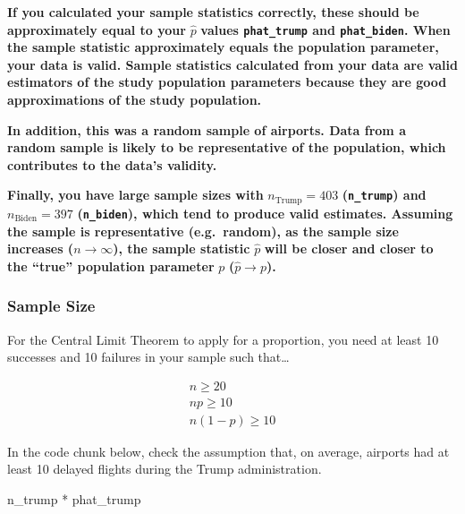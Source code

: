 \documentclass[
  letterpaper,
  DIV=11,
  numbers=noendperiod]{scrartcl}
\newenvironment{Shaded}{\begin{snugshade}}{\end{snugshade}}
\newcommand{\NormalTok}[1]{\textcolor[rgb]{0.00,0.23,0.31}{#1}}
\newcommand{\SpecialCharTok}[1]{\textcolor[rgb]{0.37,0.37,0.37}{#1}}
\begin{document}
\begin{tcolorbox}[enhanced jigsaw, toprule=.15mm, breakable, leftrule=.75mm, bottomrule=.15mm, rightrule=.15mm, colback=white, opacityback=0, colframe=quarto-callout-warning-color-frame, left=2mm, arc=.35mm]

\textbf{If you calculated your sample statistics correctly, these should
be approximately equal to your} \(\hat{p}\) \textbf{values
\texttt{phat\_trump} and \texttt{phat\_biden}. When the sample statistic
approximately equals the population parameter, your data is valid.
Sample statistics calculated from your data are valid estimators of the
study population parameters because they are good approximations of the
study population.}

\textbf{In addition, this was a random sample of airports. Data from a
random sample is likely to be representative of the population, which
contributes to the data's validity.}

\textbf{Finally, you have large sample sizes with}
\(n_{\text{Trump}}=403\) \textbf{(\texttt{n\_trump}) and}
\(n_{\text{Biden}}=397\) \textbf{(\texttt{n\_biden}), which tend to
produce valid estimates. Assuming the sample is representative
(e.g.~random), as the sample size increases (}\(n \to \infty\)\textbf{),
the sample statistic} \(\hat{p}\) \textbf{will be closer and closer to
the ``true'' population parameter} \(p\)
\textbf{(}\(\hat{p} \to p\)\textbf{).}

\end{tcolorbox}

\subsubsection{Sample Size}\label{sample-size}

For the Central Limit Theorem to apply for a proportion, you need at
least 10 successes and 10 failures in your sample such that\ldots{}

\[
\begin{aligned}
n \ge 20 \\
np \ge 10 \\
n(1-p) \ge 10
\end{aligned}
\]

In the code chunk below, check the assumption that, on average, airports
had at least 10 delayed flights during the Trump administration.

\begin{Shaded}
\begin{Highlighting}[]
\NormalTok{n\_trump }\SpecialCharTok{*}\NormalTok{ phat\_trump}
\end{Highlighting}
\end{Shaded}
\end{document}
